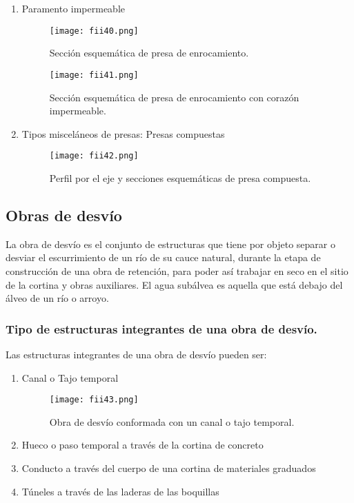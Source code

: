 \begin{enumerate}[noitemsep]
	\item Paramento impermeable
	      \begin{figure}[h!]
		      \centerline{\texttt{[image: fii40.png]}}
		      \caption{ Sección esquemática de presa de enrocamiento.}
		      \label{fii40}
	      \end{figure}
	      \begin{figure}[h!]
		      \centerline{\texttt{[image: fii41.png]}}
		      \caption{Sección esquemática de presa de enrocamiento con corazón impermeable.}
		      \label{fii41}
	      \end{figure}
	\item Tipos misceláneos de presas: Presas compuestas
	      \begin{figure}[h!]
		      \centerline{\texttt{[image: fii42.png]}}
		      \caption{Perfil por el eje y secciones esquemáticas de presa compuesta.}
		      \label{fii42}
	      \end{figure}
\end{enumerate}


\subsection{Obras de desvío}

\begin{definition}
	La obra de desvío es el conjunto de estructuras que tiene por objeto separar o
	desviar el escurrimiento de un río de su cauce natural, durante la etapa de construcción
	de una obra de retención, para poder así trabajar en seco en el sitio de la cortina y
	obras auxiliares. El agua subálvea es aquella que está debajo del álveo de un río o arroyo.
\end{definition}



\subsubsection{Tipo de estructuras integrantes de una obra de desvío.}

Las estructuras integrantes de una obra de desvío pueden ser:
\begin{enumerate}[noitemsep]
	\item  Canal o Tajo temporal
	      \begin{figure}[h!]
		      \centerline{\texttt{[image: fii43.png]}}
		      \caption{Obra de desvío conformada con un canal o tajo temporal.}
		      \label{fii43}
	      \end{figure}
	\item  Hueco o paso temporal a través de la cortina de concreto
	\item  Conducto a través del cuerpo de una cortina de materiales graduados
	\item  Túneles a través de las laderas de las boquillas
\end{enumerate}

